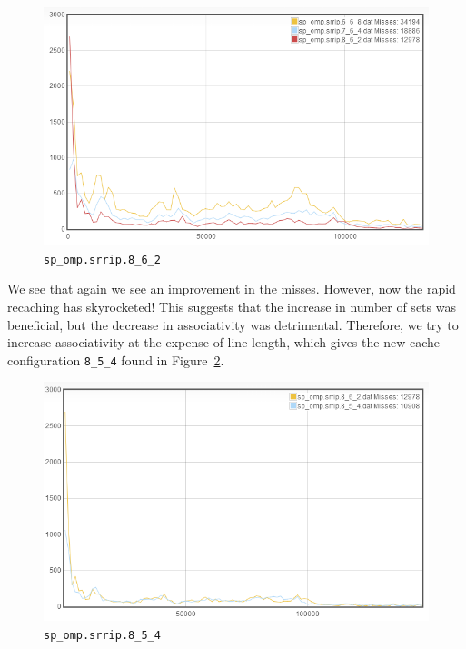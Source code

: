 \begin{figure}[ht]
\begin{center}
\includegraphics[width={0.9\columnwidth}]{images/sp_omp-srrip-8_6_2}
\end{center}
\caption{\texttt{sp\_omp.srrip.8\_6\_2}}
\label{8_6_2}
\end{figure}

We see that again we see an improvement in the misses. However, now the rapid recaching has skyrocketed! This suggests that the increase in number of sets was beneficial, but the decrease in associativity was detrimental. Therefore, we try to increase associativity at the expense of line length, which gives the new cache configuration \texttt{8\_5\_4} found in Figure~\ref{8_5_4}.

\begin{figure}[h]
\begin{center}
\includegraphics[width={0.9\columnwidth}]{images/sp_omp-srrip-8_5_4}
\end{center}
\caption{\texttt{sp\_omp.srrip.8\_5\_4}}
\label{8_5_4}
\end{figure}

